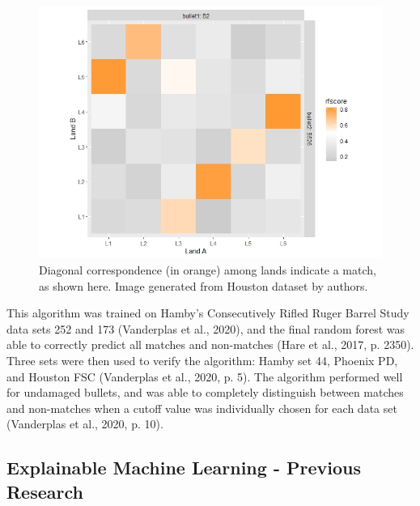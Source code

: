 \documentclass[print]{nuthesis}
\begin{document}
\begin{figure}
\includegraphics[width=\linewidth]{images/Test_Fire_F526} \caption{Diagonal correspondence (in orange) among lands indicate a match, as shown here. Image generated from Houston dataset by authors.}\label{fig:grid}
\end{figure}

This algorithm was trained on Hamby's Consecutively Rifled Ruger Barrel Study data sets 252 and 173 (Vanderplas et al., 2020), and the final random forest was able to correctly predict all matches and non-matches (Hare et al., 2017, p. 2350).
Three sets were then used to verify the algorithm: Hamby set 44, Phoenix PD, and Houston FSC (Vanderplas et al., 2020, p. 5).
The algorithm performed well for undamaged bullets, and was able to completely distinguish between matches and non-matches when a cutoff value was individually chosen for each data set (Vanderplas et al., 2020, p. 10).

\hypertarget{explainable-machine-learning---previous-research}{%
\subsection{Explainable Machine Learning - Previous Research}\label{explainable-machine-learning---previous-research}}
\end{document}
